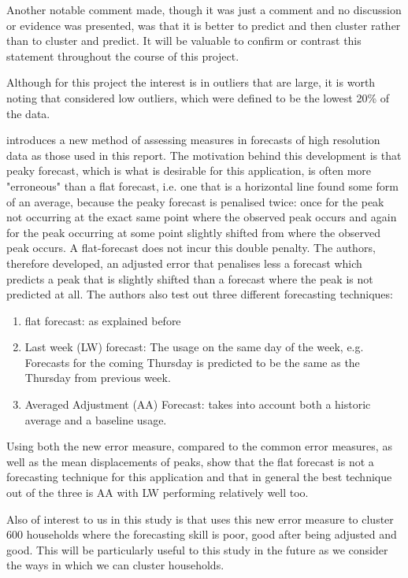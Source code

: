 \documentclass[a4paper]{article}
\begin{document}
Another notable comment \cite{Char14} made, though it was just a comment and no discussion or evidence was presented, was that it is better to predict and then cluster rather than to cluster and predict. It will be valuable to confirm or contrast this statement throughout the course of this project.

Although for this project the interest is in outliers that are large, it is worth noting that \cite{Char14} considered low outliers, which were defined to be the lowest 20\% of the data.

\cite{Dan14} introduces a new method of assessing measures in forecasts of high resolution data as those used in this report. The motivation behind this development is that peaky forecast, which is what is desirable for this application, is often more "erroneous" than a flat forecast, i.e. one that is a horizontal line found some form of an average, because the peaky forecast is penalised twice: once for the peak not occurring at the exact same point where the observed peak occurs and again for the peak occurring at some point slightly shifted from where the observed peak occurs. A flat-forecast does not incur this double penalty. The authors, therefore developed, an adjusted error that penalises less a forecast which predicts a peak that is slightly shifted than a forecast where the peak is not predicted at all. The authors also test out three different forecasting techniques:
\begin{enumerate}
\item flat forecast: as explained before
\item Last week (LW) forecast: The usage on the same day of the week, e.g. Forecasts for the coming Thursday is predicted to be the same as the Thursday from previous week.
\item Averaged Adjustment (AA) Forecast: takes into account both a historic average and a baseline usage.
\end{enumerate}

Using both the new error measure, compared to the common error measures, as well as the mean displacements of peaks, \cite{Dan14} show that the flat forecast is not a forecasting technique for this application and that in general the best technique out of the three is AA with LW performing relatively well too.

Also of interest to us in this study is that \cite{Dan14} uses this new error measure to cluster 600 households where the forecasting skill is poor, good after being adjusted and good. This will be particularly useful to this study in the future as we consider the ways in which we can cluster households.
\end{document}
